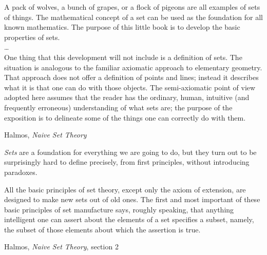 \epigraph{A pack of wolves, a bunch of grapes, or a flock of
pigeons are all examples of sets of things.
The mathematical concept of a set can be used as the foundation
for all known mathematics.
The purpose of this little book is to develop the basic properties
of sets.\\
\ldots \\
One thing that this development will not include is a definition
of sets.
The situation is analogous to the familiar axiomatic approach to
elementary geometry.
That approach does not offer a definition of points and lines;
instead it describes what it is that one can do with those
objects.
The semi-axiomatic point of view adopted here assumes that the
reader has the ordinary, human, intuitive (and frequently
erroneous) understanding of what sets are; the purpose of the
exposition is to delineate some of the things one can correctly do
with them.}%
{Halmos, \textit{Naive Set Theory}\cite{Halmos1960Naive}}

\vfill

\emph{Sets} are a foundation for everything we are going to do,
but they turn out to be surprisingly hard to define precisely,
from first principles, without introducing paradoxes.

\vfill

\label{sec:math-sets}
\lstset{language=Clojure}

\epigraph{All the basic principles of set theory, except only the
axiom of extension, are designed to make new sets out of old ones.
The first and most important of these basic principles of set
manufacture says, roughly speaking, that anything intelligent one
can assert about the elements of a set specifies a subset, namely,
the subset of those elements about which the assertion is true.}
{Halmos,
\textit{Naive Set Theory}, section 2~\cite{Halmos1960Naive}}

